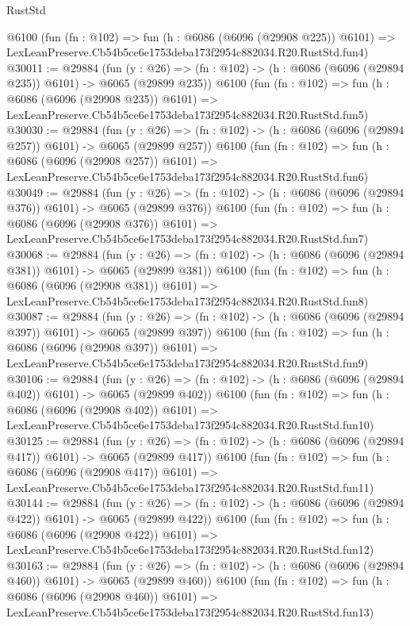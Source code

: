 \begin{lexlean}{RustStd}
\begin{coremodule}
    @6100
    (fun (fn : @102) =>
    fun (h : @6086 (@6096 (@29908 @225)) @6101) =>
    LexLeanPreserve.Cb54b5ce6e1753deba173f2954c882034.R20.RustStd.fun4)
@30011 := @29884
    (fun (y : @26) => (fn : @102) -> (h : @6086 (@6096 (@29894 @235)) @6101) -> @6065 (@29899 @235))
    @6100
    (fun (fn : @102) =>
    fun (h : @6086 (@6096 (@29908 @235)) @6101) =>
    LexLeanPreserve.Cb54b5ce6e1753deba173f2954c882034.R20.RustStd.fun5)
@30030 := @29884
    (fun (y : @26) => (fn : @102) -> (h : @6086 (@6096 (@29894 @257)) @6101) -> @6065 (@29899 @257))
    @6100
    (fun (fn : @102) =>
    fun (h : @6086 (@6096 (@29908 @257)) @6101) =>
    LexLeanPreserve.Cb54b5ce6e1753deba173f2954c882034.R20.RustStd.fun6)
@30049 := @29884
    (fun (y : @26) => (fn : @102) -> (h : @6086 (@6096 (@29894 @376)) @6101) -> @6065 (@29899 @376))
    @6100
    (fun (fn : @102) =>
    fun (h : @6086 (@6096 (@29908 @376)) @6101) =>
    LexLeanPreserve.Cb54b5ce6e1753deba173f2954c882034.R20.RustStd.fun7)
@30068 := @29884
    (fun (y : @26) => (fn : @102) -> (h : @6086 (@6096 (@29894 @381)) @6101) -> @6065 (@29899 @381))
    @6100
    (fun (fn : @102) =>
    fun (h : @6086 (@6096 (@29908 @381)) @6101) =>
    LexLeanPreserve.Cb54b5ce6e1753deba173f2954c882034.R20.RustStd.fun8)
@30087 := @29884
    (fun (y : @26) => (fn : @102) -> (h : @6086 (@6096 (@29894 @397)) @6101) -> @6065 (@29899 @397))
    @6100
    (fun (fn : @102) =>
    fun (h : @6086 (@6096 (@29908 @397)) @6101) =>
    LexLeanPreserve.Cb54b5ce6e1753deba173f2954c882034.R20.RustStd.fun9)
@30106 := @29884
    (fun (y : @26) => (fn : @102) -> (h : @6086 (@6096 (@29894 @402)) @6101) -> @6065 (@29899 @402))
    @6100
    (fun (fn : @102) =>
    fun (h : @6086 (@6096 (@29908 @402)) @6101) =>
    LexLeanPreserve.Cb54b5ce6e1753deba173f2954c882034.R20.RustStd.fun10)
@30125 := @29884
    (fun (y : @26) => (fn : @102) -> (h : @6086 (@6096 (@29894 @417)) @6101) -> @6065 (@29899 @417))
    @6100
    (fun (fn : @102) =>
    fun (h : @6086 (@6096 (@29908 @417)) @6101) =>
    LexLeanPreserve.Cb54b5ce6e1753deba173f2954c882034.R20.RustStd.fun11)
@30144 := @29884
    (fun (y : @26) => (fn : @102) -> (h : @6086 (@6096 (@29894 @422)) @6101) -> @6065 (@29899 @422))
    @6100
    (fun (fn : @102) =>
    fun (h : @6086 (@6096 (@29908 @422)) @6101) =>
    LexLeanPreserve.Cb54b5ce6e1753deba173f2954c882034.R20.RustStd.fun12)
@30163 := @29884
    (fun (y : @26) => (fn : @102) -> (h : @6086 (@6096 (@29894 @460)) @6101) -> @6065 (@29899 @460))
    @6100
    (fun (fn : @102) =>
    fun (h : @6086 (@6096 (@29908 @460)) @6101) =>
    LexLeanPreserve.Cb54b5ce6e1753deba173f2954c882034.R20.RustStd.fun13)

\end{coremodule}
\end{lexlean}
